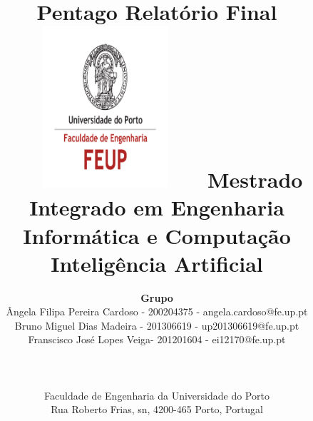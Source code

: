 



\setlength{\voffset}{0.6in}
\addtolength{\topmargin}{-.3in}
\setlength{\textwidth}{17cm}
\setlength{\textheight}{23cm}
\setlength{\parskip}{0.5em}

\title{
\Huge\textbf{Pentago}\linebreak\linebreak
\Large\textbf{Relatório Final}\linebreak\linebreak\linebreak
\includegraphics[height=6cm, width=7cm]{feup.pdf}\linebreak\linebreak
\Large{Mestrado Integrado em Engenharia Informática e Computação} \linebreak \linebreak
\Large{Inteligência Artificial}\linebreak\linebreak
}

\author{\textbf{Grupo}\\ 
Ângela Filipa Pereira Cardoso - 200204375 - angela.cardoso@fe.up.pt \\
Bruno Miguel Dias Madeira - 201306619 - up201306619@fe.up.pt \\
Franscisco José Lopes Veiga- 201201604 - ei12170@fe.up.pt \\\linebreak\linebreak \\ \\ 
 \\ Faculdade de Engenharia da Universidade do Porto \\ Rua Roberto Frias, s\/n, 4200-465 Porto, Portugal  \linebreak\linebreak\linebreak\linebreak
\linebreak\linebreak\vspace{1cm}}
\maketitle
\thispagestyle{empty}
 
